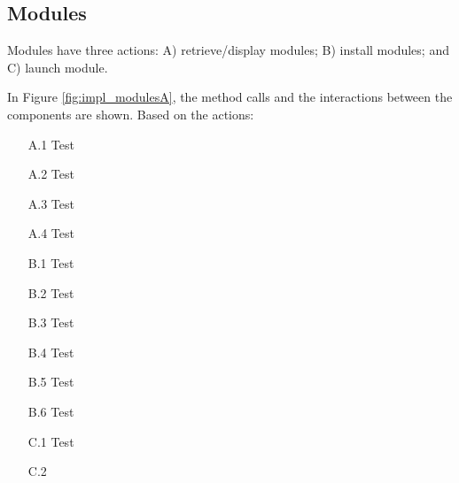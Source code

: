 \subsection{Modules}
Modules have three actions: A) retrieve/display modules; B) install modules; and C) launch module. 

In Figure \ref{fig:impl_modulesA}, the method calls and the interactions between the components are shown.  Based on the actions: 

\begin{itemize}
    \item[A.1] Test
    \item[A.2] Test
    \item[A.3] Test
    \item[A.4] Test
    \item[B.1] Test
    \item[B.2] Test
    \item[B.3] Test
    \item[B.4] Test
    \item[B.5] Test
    \item[B.6] Test
    \item[C.1] Test 
    \item[C.2]     
\end{itemize}




%    
%
%
%
%

